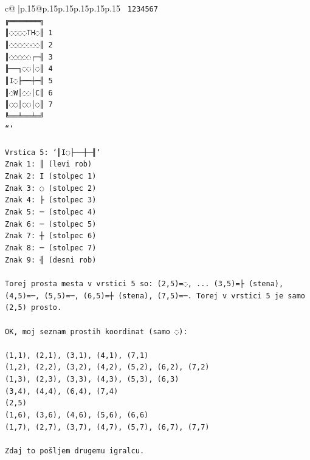 \documentclass{article}
\begin{document}
{\begin{supertabular}{c@{$\;$}|p{.15\linewidth}@{}p{.15\linewidth}p{.15\linewidth}p{.15\linewidth}p{.15\linewidth}p{.15\linewidth}}
{{{\texttt{ 1234567} \\
\texttt{╔═══════╗} \\
\texttt{║◌◌◌◌TH◌║ 1} \\
\texttt{║◌◌◌◌◌◌◌║ 2} \\
\texttt{║◌◌◌◌◌┌─╢ 3} \\
\texttt{╟──┐◌◌│◌║ 4} \\
\texttt{║I◌├──┼─╢ 5} \\
\texttt{║◌W│◌◌│C║ 6} \\
\texttt{║◌◌│◌◌│◌║ 7} \\
\texttt{╚══╧══╧═╝} \\
\texttt{```} \\
\\ 
\texttt{Vrstica 5: `║I◌├──┼─╢`} \\
\texttt{Znak 1: ║ (levi rob)} \\
\texttt{Znak 2: I (stolpec 1)} \\
\texttt{Znak 3: ◌ (stolpec 2)} \\
\texttt{Znak 4: ├ (stolpec 3)} \\
\texttt{Znak 5: ─ (stolpec 4)} \\
\texttt{Znak 6: ─ (stolpec 5)} \\
\texttt{Znak 7: ┼ (stolpec 6)} \\
\texttt{Znak 8: ─ (stolpec 7)} \\
\texttt{Znak 9: ╢ (desni rob)} \\
\\ 
\texttt{Torej prosta mesta v vrstici 5 so: (2,5)=◌, ... (3,5)=├ (stena), (4,5)=─, (5,5)=─, (6,5)=┼ (stena), (7,5)=─. Torej v vrstici 5 je samo (2,5) prosto.} \\
\\ 
\texttt{OK, moj seznam prostih koordinat (samo ◌):} \\
\\ 
\texttt{(1,1), (2,1), (3,1), (4,1), (7,1)} \\
\texttt{(1,2), (2,2), (3,2), (4,2), (5,2), (6,2), (7,2)} \\
\texttt{(1,3), (2,3), (3,3), (4,3), (5,3), (6,3)} \\
\texttt{(3,4), (4,4), (6,4), (7,4)} \\
\texttt{(2,5)} \\
\texttt{(1,6), (3,6), (4,6), (5,6), (6,6)} \\
\texttt{(1,7), (2,7), (3,7), (4,7), (5,7), (6,7), (7,7)} \\
\\ 
\texttt{Zdaj to pošljem drugemu igralcu.} \\
}}}
\end{supertabular}}
\end{document}
